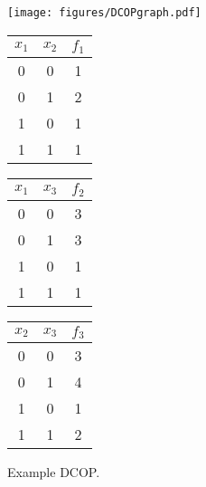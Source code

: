\documentclass[twoside,11pt]{article}
\begin{document}
\begin{figure*}[t]
\begin{center}
  \begin{minipage}[h]{30mm}
  \centering
 \texttt{[image: figures/DCOPgraph.pdf]}
  \end{minipage}
  \begin{minipage}[h]{23mm}
    \centering
    \begin{tabular}{|c|c||c|}
      \hline
      $x_1$ & $x_2$ & $f_1$ \\
      \hline
      \hline
      0 & 0 & 1 \\
      0 & 1 & 2 \\
      1 & 0 & 1 \\
      1 & 1 & 1 \\
      \hline
    \end{tabular}
  \end{minipage}
  \hspace{0.8em}
  \begin{minipage}[h]{23mm}
    \centering
    \begin{tabular}{|c|c||c|}
      \hline
      $x_1$ & $x_3$ & $f_2$ \\
      \hline
      \hline
      0 & 0 & 3 \\
      0 & 1 & 3 \\
      1 & 0 & 1 \\
      1 & 1 & 1 \\
      \hline
    \end{tabular}
  \end{minipage}
  \hspace{0.1in}
  \begin{minipage}[h]{23mm}
    \centering
    \begin{tabular}{|c|c||c|}
      \hline
      $x_2$ & $x_3$ & $f_3$ \\
      \hline
      \hline
      0 & 0 & 3 \\
      0 & 1 & 4 \\
      1 & 0 & 1 \\
      1 & 1 & 2 \\
      \hline
    \end{tabular}
 \end{minipage} 
\end{center}
\vspace{-1em}
\caption{Example DCOP. \label{fig:dcop}}
\end{figure*}
\end{document}
